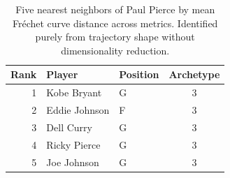 \begin{table}[htbp]
  \centering\small
  \begin{tabular}{rllc}
    \toprule
    Rank & Player & Position & Archetype \\
    \midrule
    1 & Kobe Bryant & G & 3 \\
    2 & Eddie Johnson & F & 3 \\
    3 & Dell Curry & G & 3 \\
    4 & Ricky Pierce & G & 3 \\
    5 & Joe Johnson & G & 3 \\
    \bottomrule
  \end{tabular}
  \caption{Five nearest neighbors of Paul Pierce by mean Fr\'{e}chet curve distance across metrics. Identified purely from trajectory shape without dimensionality reduction.}
  \label{tab:Paul_Pierce_frechet_curve_neighbors}
\end{table}

